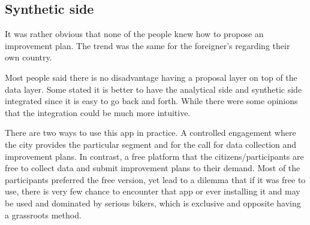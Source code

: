 \subsection{Synthetic side}
\item It was rather obvious that none of the people knew how to propose an
  improvement plan. The trend was the same for the foreigner's regarding
  their own country.
\item Most people said there is no disadvantage having a proposal layer on
  top of the data layer. Some stated it is better to have the analytical
  side and synthetic side integrated since it is easy to go back and forth.
  While there were some opinions that the integration could be much more
  intuitive.
\item There are two ways to use this app in practice. A controlled
  engagement where the city provides the particular segment and for  the
  call for data collection and improvement plans. In contrast, a free
  platform that the citizens/participants are free to collect data and
  submit improvement plans to their demand. Most of the participants
  preferred the free version, yet lead to a dilemma that if it was free to
  use, there is very few chance to encounter that app or ever installing it
  and may be used and dominated by serious bikers, which is exclusive and
  opposite having a grassroots method.

